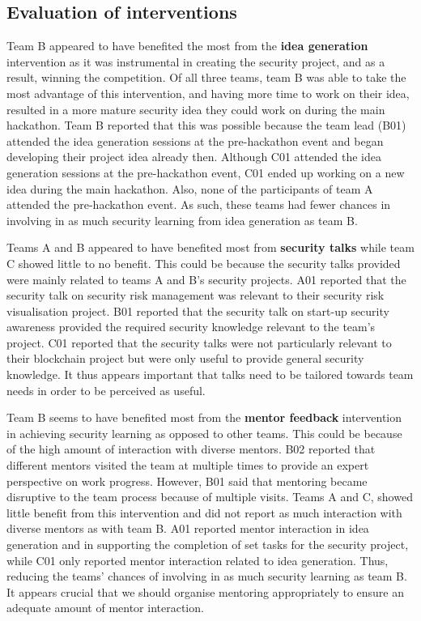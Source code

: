 \documentclass[runningheads]{llncs}
\begin{document}
\subsection{Evaluation of interventions} \label{evalintervention}
Team B appeared to have benefited the most from the \textbf{idea generation} intervention as it was instrumental in creating the security project, and as a result, winning the competition. Of all three teams, team B was able to take the most advantage of this intervention, and having more time to work on their idea, resulted in a more mature security idea they could work on during the main hackathon. Team B reported that this was possible because the team lead (B01) attended the idea generation sessions at the pre-hackathon event and began developing their project idea already then.
Although C01 attended the idea generation sessions at the pre-hackathon event, C01 ended up working on a new idea during the main hackathon. Also, none of the participants of team A attended the pre-hackathon event.
As such, these teams had fewer chances in involving in as much security learning from idea generation as team B.

Teams A and B appeared to have benefited most from \textbf{security talks} while team C showed little to no benefit. This could be because the security talks provided were mainly related to teams A and B's security projects. 
A01 reported that the security talk on security risk management was relevant to their security risk visualisation project. B01 reported that the security talk on start-up security awareness provided the required security knowledge relevant to the team's project.
C01 reported that the security talks were not particularly relevant to their blockchain project but were only useful to provide general security knowledge. It thus appears important that talks need to be tailored towards team needs in order to be perceived as useful.

Team B seems to have benefited most from the \textbf{mentor feedback} intervention in achieving security learning as opposed to other teams. This could be because of the high amount of interaction with diverse mentors. B02 reported that different mentors visited the team at multiple times to provide an expert perspective on work progress. However, B01 said that mentoring became disruptive to the team process because of multiple visits.
Teams A and C, showed little benefit from this intervention and did not report as much interaction with diverse mentors as with team B. 
A01 reported mentor interaction in idea generation and in supporting the completion of set tasks for the security project, while C01 only reported mentor interaction related to idea generation. Thus, reducing the teams' chances of involving in as much security learning as team B. 
It appears crucial that we should organise mentoring appropriately to ensure an adequate amount of mentor interaction.
\end{document}
